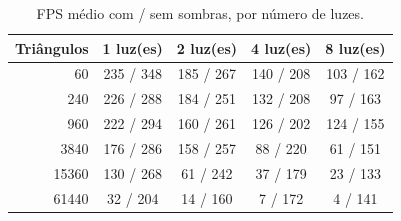 \begin{table}[t]
\centering
\caption{FPS médio com / sem sombras, por número de luzes.}
\label{tab:fps}
\begin{tabular}{rcccc}
\hline
Triângulos & 1 luz(es) & 2 luz(es) & 4 luz(es) & 8 luz(es) \\
\hline
60 & 235 / 348 & 185 / 267 & 140 / 208 & 103 / 162 \\
240 & 226 / 288 & 184 / 251 & 132 / 208 & 97 / 163 \\
960 & 222 / 294 & 160 / 261 & 126 / 202 & 124 / 155 \\
3840 & 176 / 286 & 158 / 257 & 88 / 220 & 61 / 151 \\
15360 & 130 / 268 & 61 / 242 & 37 / 179 & 23 / 133 \\
61440 & 32 / 204 & 14 / 160 & 7 / 172 & 4 / 141 \\
\hline
\end{tabular}
\end{table}
